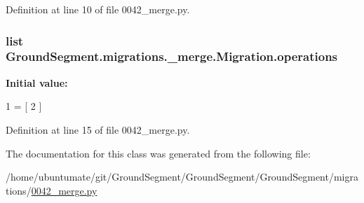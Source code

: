 Definition at line 10 of file 0042\+\_\+merge.\+py.

\hypertarget{class_ground_segment_1_1migrations_1_10042__merge_1_1_migration_a3e055653a53207f64ea9ac5865f16d44}{}
\subsubsection[{operations}]{\setlength{\rightskip}{0pt plus 5cm}list Ground\+Segment.\+migrations.\+\_\+merge.\+Migration.\+operations\hspace{0.3cm}{\ttfamily [static]}}\label{class_ground_segment_1_1migrations_1_10042__merge_1_1_migration_a3e055653a53207f64ea9ac5865f16d44}
{\bfseries Initial value\+:}
\begin{DoxyCode}
1 = [
2     ]
\end{DoxyCode}


Definition at line 15 of file 0042\+\_\+merge.\+py.



The documentation for this class was generated from the following file\+:\begin{DoxyCompactItemize}
\item 
/home/ubuntumate/git/\+Ground\+Segment/\+Ground\+Segment/\+Ground\+Segment/migrations/\hyperlink{0042__merge_8py}{0042\+\_\+merge.\+py}\end{DoxyCompactItemize}
